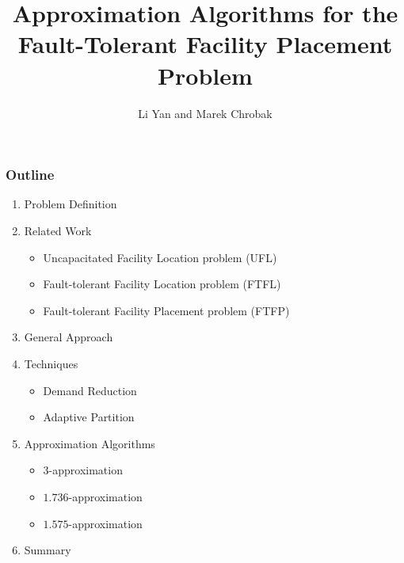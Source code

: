 \documentclass[handout, hyperref, xcolor=dvipsnames]{beamer}
\title[FTFP]{Approximation Algorithms
  for the Fault-Tolerant Facility Placement Problem}
\author[lyan,marek]{Li Yan and Marek Chrobak}
\institute[UCR]{
  Computer Science\\
  University of California Riverside\\
}
\date{}
\begin{document}
\begin{frame}
  \titlepage
\end{frame}

\begin{frame}
  \frametitle{Outline}
  \begin{enumerate}

  \item Problem Definition

  \item Related Work
    \begin{itemize}
    \item Uncapacitated Facility Location problem (UFL)
    \item Fault-tolerant Facility Location problem (FTFL)
    \item Fault-tolerant Facility Placement problem (FTFP)
    \end{itemize}

  \item General Approach

  \item Techniques
    \begin{itemize}
    \item Demand Reduction
    \item Adaptive Partition
    \end{itemize}

  \item Approximation Algorithms
      \begin{itemize}
        \item $3$-approximation
        \item $1.736$-approximation
        \item $1.575$-approximation
        \end{itemize}

  \item{Summary}
  \end{enumerate}
\end{frame}
\end{document}
